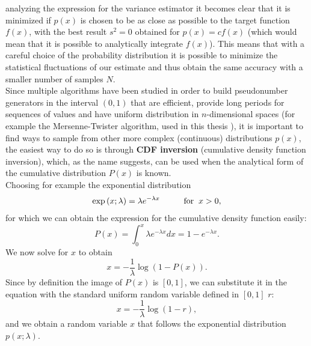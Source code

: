 analyzing the expression for the variance estimator it becomes clear that it is minimized if $p(x)$ is chosen to be as close as 
possible to the target function $f(x)$, with the best result $s^2=0$ obtained for $p(x) = cf(x)$ (which would mean that it is possible to analytically 
integrate $f(x)$). This means that with a careful choice of the probability distribution it is possible to minimize the statistical fluctuations 
of our estimate and thus obtain the same accuracy with a smaller number of samples $N$.\\
Since multiple algorithms have been studied in order to build pseudonumber generators in the interval $(0,1)$ that are efficient, provide long periods 
for sequences of values and have uniform distribution in $n$-dimensional spaces (for example the Mersenne-Twister algorithm, used in this thesis \cite{matsumoto1998mersenne}), 
it is important to find ways to sample from other more complex (continuous) distributions $p(x)$, the easiest way to do so is through \textbf{CDF inversion} 
(cumulative density function inversion), which, as the name suggests, can be used when the analytical form of the cumulative distribution 
$P(x)$ is known.\\
Choosing for example the exponential distribution 
\begin{equation}
    \exp{\left(x;\lambda\right)}=\lambda e^{-\lambda x}\hspace{1cm}\text{for}\hspace{0.2cm}x>0, 
\end{equation}
for which we can obtain the expression for the cumulative density function easily:
\begin{equation}
    P(x)=\int_{0}^{x}\lambda e^{-\lambda x}dx = 1-e^{-\lambda x}.
\end{equation}
We now solve for $x$ to obtain
\begin{equation}
    x=-\frac{1}{\lambda}\log{(1-P(x))}.
\end{equation}
Since by definition the image of $P(x)$ is $[0,1]$, we can substitute it in the equation with the standard uniform random variable defined 
in $[0,1]$ $r$:
\begin{equation}
    x=-\frac{1}{\lambda}\log{(1-r)},
\end{equation}
and we obtain a random variable $x$ that follows the exponential distribution $p(x;\lambda)$.
